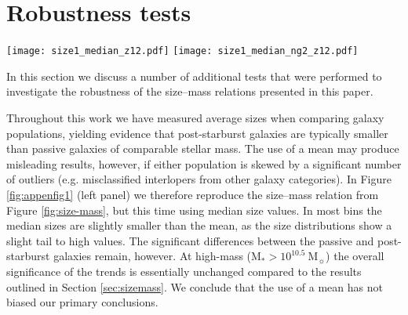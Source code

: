\documentclass[a4paper,fleqn,usenatbib,useAMS]{mnras}
\begin{document}
\appendix
\section{Robustness tests}
\label{sec:appendix}



\begin{figure*}
	\texttt{[image: size1\_median\_z12.pdf]}
	\texttt{[image: size1\_median\_ng2\_z12.pdf]}
    \caption{Two examples of tests for robustness.  The left panel
      shows the size--mass relation for comparison with  Figure \ref{fig:size-mass}
      ($1<z<2$), but using the median rather than the mean effective
      radius per bin.  The right panel shows the size--mass relation
      (also using median values) after the removal of all passive and
      post-starburst galaxies with $n<2$. Since star-forming galaxies
      have significantly lower S\'{e}rsic indices (see Figure
      \ref{fig:sersicfig}), this is a test to determine if
      contamination from SF galaxies is affecting the size--mass
      relations.  In both cases, we find that our primary conclusions
      are unchanged, i.e. post-starburst galaxies at high mass
      (M$_{\ast}> 10^{10.5} ~$M$_{\sun}$) appear significantly smaller
      than both star-forming and passive galaxies. 
}
    \label{fig:appenfig1}
\end{figure*}



In this section we discuss a number of additional tests that were
performed to investigate  the robustness of the size--mass relations presented
in this paper.

Throughout this work we have measured average sizes when comparing
galaxy populations, yielding evidence that post-starburst galaxies are
typically smaller than passive galaxies of comparable stellar
mass. The use of a mean may produce misleading results, however, if
either population is skewed by a significant number of outliers
(e.g. misclassified interlopers from other galaxy categories).  In
Figure \ref{fig:appenfig1} (left panel) we therefore reproduce the
size--mass relation from Figure \ref{fig:size-mass}, but this time
using median size values. In most bins the median sizes are slightly
smaller than the mean, as the size distributions show a slight tail to
high values. The significant differences between the passive and
post-starburst galaxies remain, however. At high-mass (M$_{\ast}>
10^{10.5} ~$M$_{\sun}$) the overall significance of the trends is
essentially unchanged compared to the results outlined in Section
\ref{sec:sizemass}. We conclude that the use of a mean has not biased
our primary conclusions.
\end{document}
